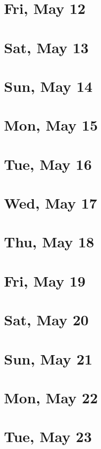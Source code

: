 	\section{Fri, May 12}
		
	\section{Sat, May 13}
		
	\section{Sun, May 14}
		
	\section{Mon, May 15}
		
	\section{Tue, May 16}
		
	\section{Wed, May 17}
		
	\section{Thu, May 18}
		
	\section{Fri, May 19}
		
	\section{Sat, May 20}
		
	\section{Sun, May 21}
		
	\section{Mon, May 22}
		
	\section{Tue, May 23}
		
